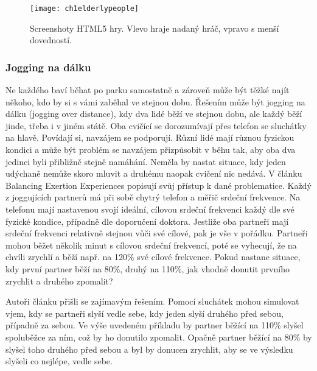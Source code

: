 \begin{figure}
  \centering
  \texttt{[image: ch1elderlypeople]}
	\caption{Screenshoty HTML5 hry. Vlevo hraje nadaný hráč, vpravo s menší dovedností. \cite{8} }
	\label{ch1elderlypeople}
\end{figure}

\subsubsection{Jogging na dálku}

Ne každého baví běhat po parku samostatně a zároveň může být těžké najít někoho, kdo by si s vámi zaběhal ve stejnou dobu. Řešením může být jogging na dálku (jogging over distance), kdy dva lidé běží ve stejnou dobu, ale každý běží jinde, třeba i v jiném státě. Oba cvičící se dorozumívají přes telefon se sluchátky na hlavě. Povídají si, navzájem se podporují.
Různí lidé mají různou fyzickou kondici a může být problém se navzájem přizpůsobit v běhu tak, aby oba dva jedinci byli přibližně stejně namáhání. Neměla by nastat situace, kdy jeden udýchaně nemůže skoro mluvit a druhému naopak cvičení nic nedává.
V článku Balancing Exertion Experiences \cite{7} popisují svůj přístup k dané problematice. Každý z joggujících partnerů má při sobě chytrý telefon a měřič srdeční frekvence. Na telefonu mají nastavenou svojí ideální, cílovou srdeční frekvenci každý dle své fyzické kondice, případně dle doporučení doktora. Jestliže oba partneři mají srdeční frekvenci relativně stejnou vůči své cílové, pak je vše v pořádku. Partneři mohou běžet několik minut s cílovou srdeční frekvencí, poté se vyhecují, že na chvíli zrychlí a běží např. na 120\% své cílové frekvence. Pokud nastane situace, kdy první partner běží na 80\%, druhý na 110\%, jak vhodně donutit prvního zrychlit a druhého zpomalit? 

Autoři článku přišli se zajímavým řešením. Pomocí sluchátek mohou simulovat vjem, kdy se partneři slyší vedle sebe, kdy jeden slyší druhého před sebou, případně za sebou. Ve výše uvedeném příkladu by partner běžící na 110\% slyšel spoluběžce za ním, což by ho donutilo zpomalit. Opačně partner běžící na 80\% by slyšel toho druhého před sebou a byl by donucen zrychlit, aby se ve výsledku slyšeli co nejlépe, vedle sebe.



\endinput
